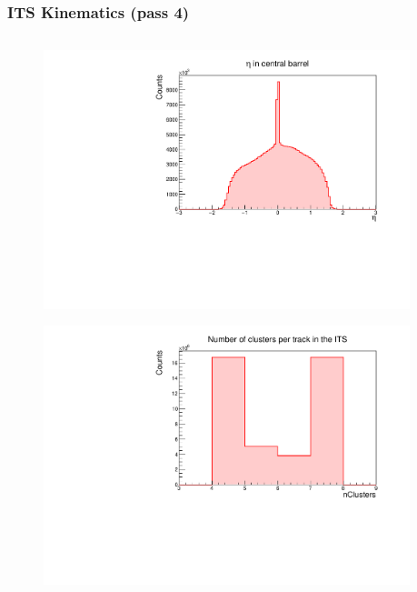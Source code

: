 \documentclass[10pt]{beamer}
\begin{document}
\begin{frame}
    \frametitle{ITS Kinematics (pass 4)}

    \begin{columns}
        \begin{column}{0.5\textwidth}
            \vspace*{-0.43cm}
            \begin{figure}
                \begin{center}
                    \includegraphics[width=0.95\textwidth]{Plots/pass4_TracksIU_nohasITS/eta.pdf}
                \end{center}
            \end{figure}
            \vspace*{-0.6cm}
            \begin{figure}
                \begin{center}
                    \includegraphics[width=0.95\textwidth]{Plots/pass4_TracksIU_nohasITS/itsNCls.pdf}

\end{center}
\end{figure}
\end{column}
\end{columns}
\end{frame}
\end{document}
